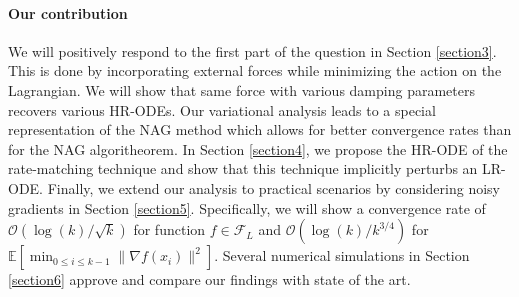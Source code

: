 \documentclass{article}
\theoremstyle{plain}
\theoremstyle{definition}
\theoremstyle{remark}
\begin{document}
\paragraph{Our contribution} We will positively respond to the first part of the question in Section \ref{section3}. This is done by incorporating external forces while minimizing the action on the Lagrangian. We will show that same force with various damping parameters recovers various HR-ODEs. Our variational analysis leads to a special representation of the NAG method which allows for better convergence rates than \citep{shi2019acceleration} for the NAG algoritheorem. In Section \ref{section4}, we propose the HR-ODE of the rate-matching technique and show that this technique implicitly perturbs an LR-ODE. Finally, we extend our analysis to practical scenarios by considering noisy gradients in Section \ref{section5}. Specifically, we will show a convergence rate of \(\mathcal O(\log(k)/\sqrt{k})\) for function \(f\in\mathcal{F}_L\) and \(\mathcal{O}(\log(k)/k^{3/4})\) for \(\mathbb E\left[\min_{0\leq i\leq k-1}\|\nabla f(x_i)\|^2 \right]\). Several numerical simulations in Section \ref{section6} approve and compare our findings with state of the art.

 
\end{document}
